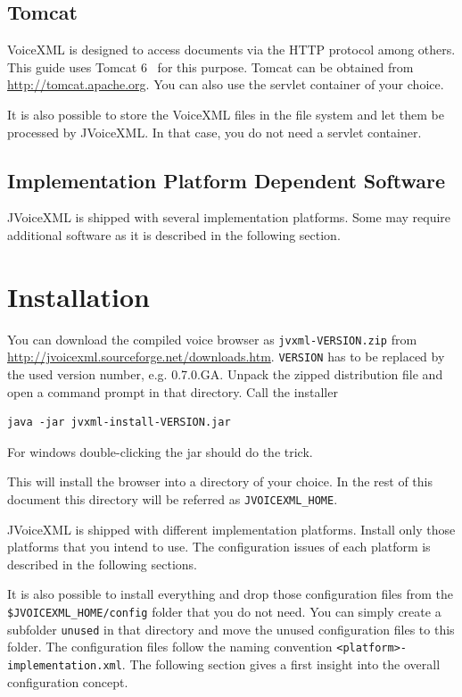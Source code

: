 \documentclass[11pt,a4paper]{book}
\begin{document}
\subsection{Tomcat}
\label{sec:tomcat}

VoiceXML is designed to access documents via the HTTP protocol among others. This
guide uses Tomcat 6~\cite{apache:tomcat} for this purpose.
Tomcat can be obtained
from \url{http://tomcat.apache.org}. You can also use the servlet container of
your choice.

It is also possible to store the VoiceXML files in the file system and let
them be processed by JVoiceXML. In that case, you do not need a servlet
container.

\subsection{Implementation Platform Dependent Software}

JVoiceXML is shipped with several implementation platforms. Some may require
additional software as it is described in the following section.

\section{Installation}
\label{sec:installation}

You can download the compiled voice browser as \texttt{jvxml-VERSION.zip} from 
\url{http://jvoicexml.sourceforge.net/downloads.htm}.
\texttt{VERSION} has to be replaced by the used version number, e.g. 0.7.0.GA.
Unpack the zipped distribution file and open a command prompt in that
directory. Call the installer 

\begin{lstlisting}
java -jar jvxml-install-VERSION.jar
\end{lstlisting}

For windows double-clicking the jar should do the trick. 

This will install the browser into a directory of your choice. In the rest of 
this document this directory will be referred as \lstinline{JVOICEXML_HOME}.

JVoiceXML is shipped with different implementation platforms. Install only
those platforms that you intend to use. The configuration issues of each
platform is described in the following sections.

It is also possible to install everything and drop those configuration files
from the \lstinline{$JVOICEXML_HOME/config} folder that you do not need. You
can simply create a subfolder \lstinline{unused} in that directory and move the
unused configuration files to this folder. The configuration files follow the
naming convention \lstinline{<platform>-implementation.xml}. The following
section gives a first insight into the overall configuration concept.
\end{document}
